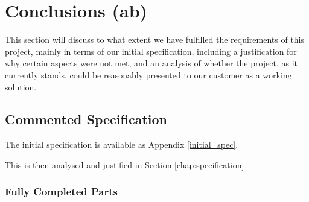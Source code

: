 
\chapter{Conclusions (ab)}

This section will discuss to what extent we have fulfilled the requirements 
of this project, mainly in terms of our initial specification, including a 
justification for why certain aspects were not met, and an analysis of 
whether the project, as it currently stands, could be reasonably presented to our customer as a working solution.

\section{Commented Specification}

The initial specification is available as Appendix \ref{initial_spec}. 

This is then analysed and justified in Section \ref{chap:specification}

\subsection{Fully Completed Parts}

